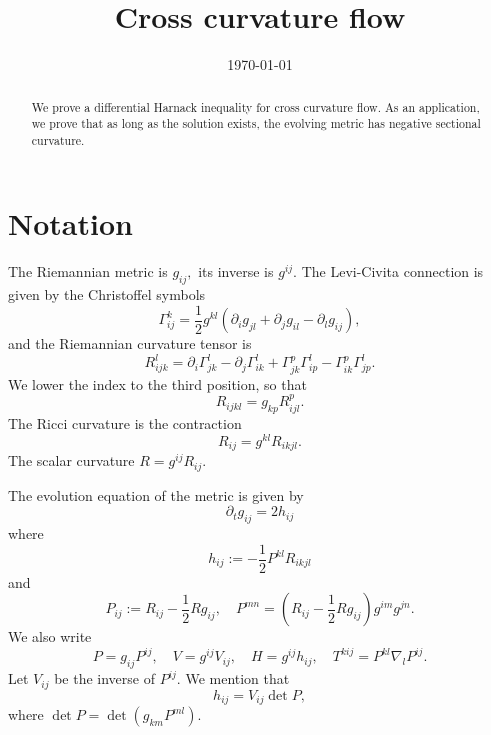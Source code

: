 \documentclass{amsart}
\theoremstyle{definition}
\theoremstyle{remark}
\numberwithin{equation}{section}
\begin{document}
\title[Cross curvature flow]
 {Cross curvature flow}

\curraddr{}
\email{}
\date{\today}

\dedicatory{}
\subjclass[2010]{}
\keywords{}

\begin{abstract}
We prove a differential Harnack inequality for cross curvature flow. As an application, we prove that as long as the solution exists, the evolving metric has negative sectional curvature.
\end{abstract}

\maketitle

\section{Notation}
The Riemannian metric is $g_{ij},$ its inverse is $g^{ij}$. The Levi-Civita connection is given by the Christoffel symbols
\begin{equation}
\Gamma_{ij}^k=\frac{1}{2}g^{kl}\left(\partial_ig_{jl}+\partial_jg_{il}-\partial_lg_{ij}\right),
\end{equation}
and the Riemannian curvature tensor is
\begin{equation}
R_{ijk}^l=\partial_i\Gamma_{jk}^l-\partial_j\Gamma_{ik}^l+\Gamma_{jk}^p\Gamma_{ip}^l-\Gamma_{ik}^p\Gamma_{jp}^l.
\end{equation}
We lower the index to the third position, so that
\begin{equation}
R_{ijkl}=g_{kp}R_{ijl}^p.
\end{equation}
The Ricci curvature is the contraction
\begin{equation}
R_{ij}=g^{kl}R_{ikjl}.
\end{equation}
The scalar curvature $R=g^{ij}R_{ij}.$

The evolution equation of the metric is given by
\begin{equation}
\partial_tg_{ij}=2h_{ij}
\end{equation}
where
\begin{equation}
h_{ij}:=-\frac{1}{2}P^{kl}R_{ikjl}
\end{equation}
and
\begin{equation}
P_{ij}:=R_{ij}-\frac{1}{2}Rg_{ij},\quad
P^{mn}=\left(R_{ij}-\frac{1}{2}Rg_{ij}\right)g^{im}g^{jn}.
\end{equation}
We also write
\begin{equation}
P=g_{ij}P^{ij},\quad V=g^{ij}V_{ij},\quad H=g^{ij}h_{ij},\quad  T^{kij}=P^{kl}\nabla_l P^{ij}.
\end{equation}
Let $V_{ij}$ be the inverse of $P^{ij}$. We mention that
\begin{equation}
h_{ij}=V_{ij}\det P,
\end{equation}
where $\det P = \det (g_{km} P^{ml}).$
\end{document}
